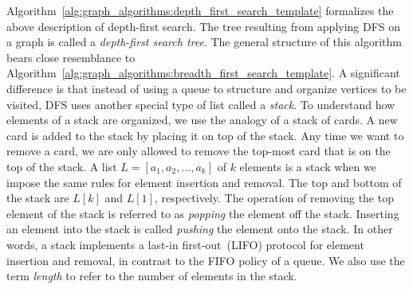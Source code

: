Algorithm~\ref{alg:graph_algorithms:depth_first_search_template}
formalizes the above description of depth-first search. The tree
resulting from applying DFS on a graph is called a
\emph{depth-first search tree}. The general structure of this
algorithm bears close resemblance to
Algorithm~\ref{alg:graph_algorithms:breadth_first_search_template}. A
significant difference is that instead of using a queue to structure
and organize vertices to be visited, DFS uses another special type of
list called a \emph{stack}. To understand how elements of a stack are
organized, we use the analogy of a stack of cards. A new card is added
to the stack by placing it on top of the stack. Any time we want to
remove a card, we are only allowed to remove the top-most card that is
on the top of the stack. A list $L = [a_1, a_2, \dots, a_k]$ of $k$
elements is a stack when we impose the same rules for element
insertion and removal. The top and bottom of the stack are $L[k]$ and
$L[1]$, respectively. The operation of removing the top element of the
stack is referred to as \emph{popping} the element off the
stack. Inserting an element into the stack is called \emph{pushing}
the element onto the stack. In other words, a stack implements a
last-in first-out~(LIFO) protocol for element insertion and removal,
in contrast to the FIFO policy of a queue. We also use the term
\emph{length} to refer to the number of elements in the stack.

